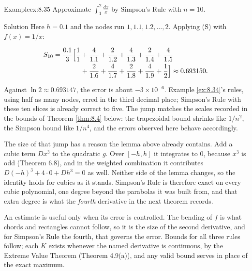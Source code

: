 \documentclass[a4paper,12pt,oneside]{memoir}
\begin{document}
\begin{workedexample}
\begin{envexample}{Example}{ex:8.35}{}
Approximate \(\displaystyle\int_{1}^{2} \frac{dx}{x}\) by Simpson’s Rule with \(n = 10\).
\end{envexample}
\begin{envsolution}{Solution}{}{}
Here \(h = 0.1\) and the nodes run \(1, 1.1, 1.2, \dots, 2\). Applying (S) with \(f(x) = 1/x\):

\[ \begin{aligned}
          S_{10} = \frac{0.1}{3}\Bigl[\frac{1}{1} &+ \frac{4}{1.1} + \frac{2}{1.2} + \frac{4}{1.3} + \frac{2}{1.4} + \frac{4}{1.5} \\
            &+ \frac{2}{1.6} + \frac{4}{1.7} + \frac{2}{1.8} + \frac{4}{1.9} + \frac{1}{2}\Bigr] \approx 0.693150.
        \end{aligned} \]

Against \(\ln 2 \approx 0.693147\), the error is about \(-3 \times 10^{-6}\). Example \ref{ex:8.34}’s rules, using half as many nodes, erred in the third decimal place; Simpson’s Rule with these ten slices is already correct to five. The jump matches the scales recorded in the bounds of Theorem \ref{thm:8.4} below: the trapezoidal bound shrinks like \(1/n^{2}\), the Simpson bound like \(1/n^{4}\), and the errors observed here behave accordingly. \qedmark
\end{envsolution}
\end{workedexample}
The size of that jump has a reason the lemma above already contains. Add a cubic term \(Dx^{3}\) to the quadratic \(g\). Over \([-h, h]\) it integrates to \(0\), because \(x^{3}\) is odd (Theorem 6.8), and in the weighted combination it contributes \(D(-h)^{3} + 4 \cdot 0 + Dh^{3} = 0\) as well. Neither side of the lemma changes, so the identity holds for cubics as it stands. Simpson’s Rule is therefore exact on every cubic polynomial, one degree beyond the parabolas it was built from, and that extra degree is what the \emph{fourth} derivative in the next theorem records.

An estimate is useful only when its error is controlled. The bending of \(f\) is what chords and rectangles cannot follow, so it is the size of the second derivative, and for Simpson’s Rule the fourth, that governs the error. Bounds for all three rules follow; each \(K\) exists whenever the named derivative is continuous, by the Extreme Value Theorem (Theorem 4.9(a)), and any valid bound serves in place of the exact maximum.
\end{document}
